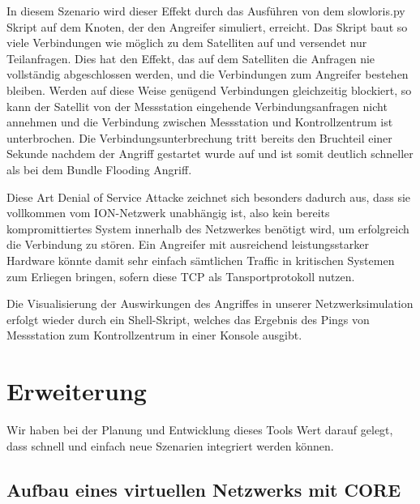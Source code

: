 \documentclass{article}
\begin{document}
In diesem Szenario wird dieser Effekt durch das Ausführen von dem slowloris.py Skript auf dem Knoten, der den Angreifer simuliert, erreicht. Das Skript baut so viele Verbindungen wie möglich zu dem Satelliten auf und versendet nur Teilanfragen. Dies hat den Effekt, das auf dem Satelliten die Anfragen nie vollständig abgeschlossen werden, und die Verbindungen zum Angreifer bestehen bleiben. Werden auf diese Weise genügend Verbindungen gleichzeitig blockiert, so kann der Satellit von der  Messstation eingehende Verbindungsanfragen nicht annehmen und die Verbindung zwischen Messstation und Kontrollzentrum ist unterbrochen. Die Verbindungsunterbrechung tritt bereits den Bruchteil einer Sekunde nachdem der Angriff gestartet wurde auf und ist somit deutlich schneller als bei dem Bundle Flooding Angriff.\par
Diese Art Denial of Service Attacke zeichnet sich besonders dadurch aus, dass sie vollkommen vom ION-Netzwerk unabhängig ist, also kein bereits kompromittiertes System innerhalb des Netzwerkes benötigt wird, um erfolgreich die Verbindung zu stören. Ein Angreifer mit ausreichend leistungsstarker Hardware könnte damit sehr einfach sämtlichen Traffic in kritischen Systemen zum Erliegen bringen, sofern diese TCP als Tansportprotokoll nutzen.\par
Die Visualisierung der Auswirkungen des Angriffes in unserer Netzwerksimulation erfolgt wieder durch ein Shell-Skript, welches das Ergebnis des Pings von Messstation zum Kontrollzentrum in einer Konsole ausgibt. 
\newpage
\section{Erweiterung}
Wir haben bei der Planung und Entwicklung dieses Tools Wert darauf gelegt, dass schnell und einfach neue Szenarien integriert werden können.
\subsection{Aufbau eines virtuellen Netzwerks mit CORE}
\end{document}
